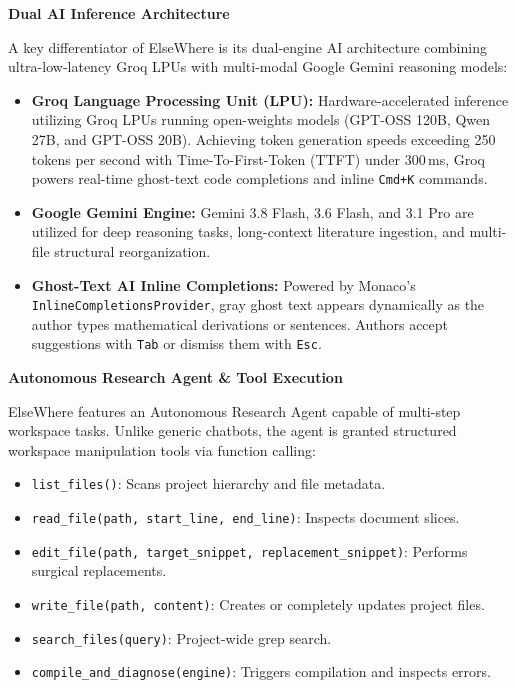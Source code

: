 \documentclass[12pt,a4paper,twoside]{article}
\newcommand{\subhead}[2]{%
  \begingroup\setlength{\parskip}{0pt}\vspace{10pt}%
  \noindent\hspace*{0.25in}\makebox[0.35in][l]{\fontsize{13pt}{15.6pt}\selectfont\bfseries #1}%
  {\fontsize{13pt}{15.6pt}\selectfont\bfseries #2}\par\nopagebreak
  \vspace{4pt}
  \endgroup}
\newcommand{\code}[1]{\texttt{#1}}
\begin{document}
\subhead{4.2}{Dual AI Inference Architecture}
A key differentiator of ElseWhere is its dual-engine AI architecture combining ultra-low-latency Groq LPUs with multi-modal Google Gemini reasoning models:
\begin{itemize}[leftmargin=0.4in,itemsep=2pt,topsep=2pt,parsep=0pt]
    \item \textbf{Groq Language Processing Unit (LPU):} Hardware-accelerated inference utilizing Groq LPUs running open-weights models (GPT-OSS 120B, Qwen 27B, and GPT-OSS 20B). Achieving token generation speeds exceeding 250 tokens per second with Time-To-First-Token (TTFT) under 300\,ms, Groq powers real-time ghost-text code completions and inline \code{Cmd+K} commands.
    \item \textbf{Google Gemini Engine:} Gemini 3.8 Flash, 3.6 Flash, and 3.1 Pro are utilized for deep reasoning tasks, long-context literature ingestion, and multi-file structural reorganization.
    \item \textbf{Ghost-Text AI Inline Completions:} Powered by Monaco's \code{Inline\allowbreak Completions\allowbreak Provider}, gray ghost text appears dynamically as the author types mathematical derivations or sentences. Authors accept suggestions with \code{Tab} or dismiss them with \code{Esc}.
\end{itemize}

\subhead{4.3}{Autonomous Research Agent \& Tool Execution}
ElseWhere features an Autonomous Research Agent capable of multi-step workspace tasks. Unlike generic chatbots, the agent is granted structured workspace manipulation tools via function calling:
\begin{itemize}[leftmargin=0.4in,itemsep=2pt,topsep=2pt,parsep=0pt]
    \item \code{list\_files()}: Scans project hierarchy and file metadata.
    \item \code{read\_file(path, start\_line, end\_line)}: Inspects document slices.
    \item \code{edit\_file(path, target\_snippet, replacement\_snippet)}: Performs surgical replacements.
    \item \code{write\_file(path, content)}: Creates or completely updates project files.
    \item \code{search\_files(query)}: Project-wide grep search.
    \item \code{compile\_and\_diagnose(engine)}: Triggers compilation and inspects errors.
\end{itemize}
\end{document}

